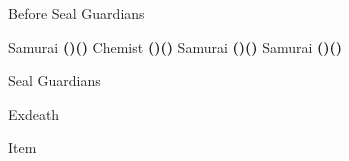 \begin{paracol}{2}
\begin{menu}{Before Seal Guardians}
    \varwb
    \begin{jobMenu}
        \lenna Samurai \textbf{(\pointLeft)(\pointDown)} \optimize
        \bartz Chemist \textbf{(\pointUp)(\pointRight)} \ability{!\gilToss} \optimize
        \faris Samurai \textbf{(\pointLeft)(\pointDown)} \equip{\goldShield}
        \galuf Samurai \textbf{(\pointLeft)(\pointDown)} \optimize
    \end{jobMenu}
    \begin{itemMenu}
        \hiPotionMenu {}
    \end{itemMenu}
    \varwe
\end{menu}

\begin{boss}{Seal Guardians}
    \varwb
    \begin{round}{1}
        \bartz \rightCommand{\gilToss}
        \everyoneElse \leftCommand{\gilToss}
    \end{round}
    \varwe
\end{boss}

\begin{boss}{Exdeath}
    \varwb
    \begin{round}{1}
        \galuf Item \then \phoenixDown \space \then {}
    \end{round}
    \varwe
\end{boss}

\end{paracol}